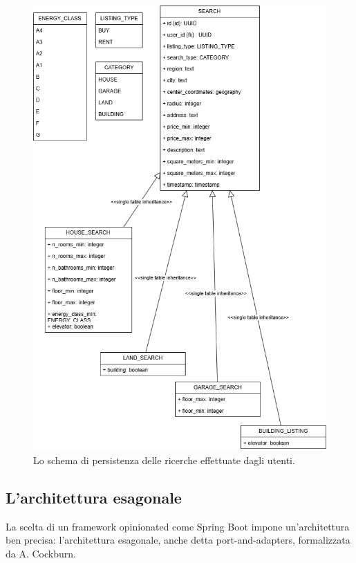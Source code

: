 \begin{figure}[h]
    \centering
    \includegraphics[width=\textwidth]{assets/diagrams/db-scheme/search.png}
    \caption{Lo schema di persistenza delle ricerche effettuate dagli utenti.}
    \label{fig:Schema di persistenza delle ricerche effettuate dagli utenti}
\end{figure}

\subsection{L'architettura esagonale}
La scelta di un framework opinionated come Spring Boot impone un’architettura ben precisa: 
l'architettura esagonale, anche detta port-and-adapters, formalizzata da A. Cockburn.

